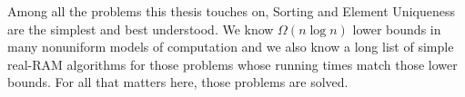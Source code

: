 Among all the problems this thesis touches on, Sorting and Element Uniqueness
are the simplest and best understood. We know \(\Omega(n \log n)\) lower bounds in many
nonuniform models of computation and we also know a long list of simple
real-RAM algorithms for those problems whose running times match those lower
bounds. For all that matters here, those problems are solved.




%







